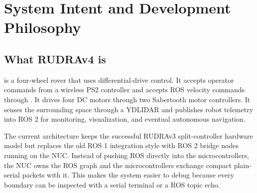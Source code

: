 \chapter{System Intent and Development Philosophy}

\section{What RUDRAv4 is}

\RUDRAv{} is a four-wheel rover that uses differential-drive control. It accepts operator commands from a wireless PS2 controller and accepts ROS velocity commands through . It drives four DC motors through two Sabertooth motor controllers. It senses the surrounding space through a YDLIDAR and publishes robot telemetry into ROS 2 for monitoring, visualization, and eventual autonomous navigation.

The current architecture keeps the successful RUDRAv3 split-controller hardware model but replaces the old ROS 1 integration style with ROS 2 bridge nodes running on the NUC. Instead of pushing ROS directly into the microcontrollers, the NUC owns the ROS graph and the microcontrollers exchange compact plain-serial packets with it. This makes the system easier to debug because every boundary can be inspected with a serial terminal or a ROS topic echo.

